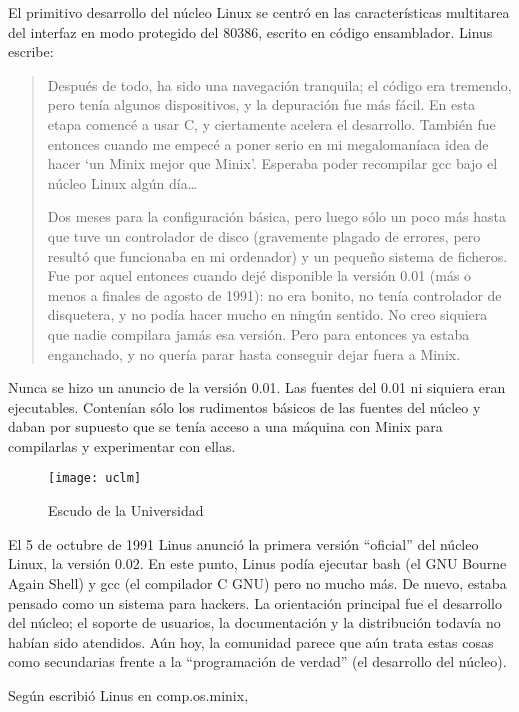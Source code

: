 El primitivo desarrollo del núcleo Linux se centró en las
características multitarea del interfaz en modo protegido del 80386,
escrito en código ensamblador. Linus escribe:

\begin{quote}
Después de todo, ha sido una navegación tranquila; el código
era
tremendo, pero tenía algunos dispositivos, y la depuración fue más
fácil. En esta etapa comencé a usar C, y ciertamente acelera el
desarrollo. También fue entonces cuando me empecé a poner serio en mi
megalomaníaca idea de hacer `un Minix mejor que Minix'. Esperaba poder
recompilar gcc bajo el núcleo Linux algún día\dots


Dos meses para la configuración básica, pero luego sólo un poco más
hasta que tuve un controlador de disco (gravemente plagado de errores,
pero resultó que funcionaba en mi ordenador) y un pequeño sistema de
ficheros. Fue por aquel entonces cuando dejé disponible la versión
0.01 (más o menos a finales de agosto de 1991): no era bonito, no
tenía controlador de disquetera, y no podía hacer mucho en ningún
sentido. No creo siquiera que nadie compilara jamás esa versión. Pero
para entonces ya estaba enganchado, y no quería parar hasta conseguir
dejar fuera a Minix.
\end{quote}

Nunca se hizo un anuncio de la versión 0.01. Las fuentes del 0.01 ni
siquiera eran ejecutables. Contenían sólo los rudimentos básicos de
las fuentes del núcleo y daban por supuesto que se tenía acceso a una
máquina con Minix para compilarlas y experimentar con ellas.

\begin{figure}
\centering
\texttt{[image: uclm]}
\caption{Escudo de la Universidad}
\end{figure}

El 5 de octubre de 1991 Linus anunció la primera versión ``oficial''
del núcleo Linux, la versión 0.02. En este punto, Linus podía ejecutar
bash (el GNU Bourne Again Shell) y gcc (el compilador C GNU) pero no
mucho más. De nuevo, estaba pensado como un sistema para hackers. La
orientación principal fue el desarrollo del núcleo; el soporte de
usuarios, la documentación y la distribución todavía no habían sido
atendidos. Aún hoy, la comunidad parece que aún trata estas cosas como
secundarias frente a la ``programación de verdad'' (el desarrollo del
núcleo).

Según escribió Linus en comp.os.minix,


